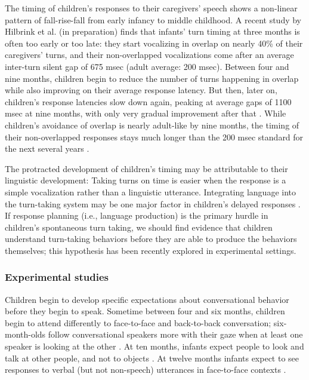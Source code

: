 \documentclass[authoryear, 12pt]{elsarticle}
\begin{document}
The timing of children's responses to their caregivers' speech shows a non-linear pattern of fall-rise-fall from early infancy to middle childhood. A recent study by Hilbrink et al. (in preparation) finds that infants' turn timing at three months is often too early or too late: they start vocalizing in overlap on nearly 40\% of their caregivers' turns, and their non-overlapped vocalizations come after an average inter-turn silent gap of 675 msec (adult average: 200 msec). Between four and nine months, children begin to reduce the number of turns happening in overlap while also improving on their average response latency. But then, later on, children's response latencies slow down again, peaking at average gaps of 1100 msec at nine months, with only very gradual improvement after that \citep{hilbrinkInPrep}. While children's avoidance of overlap is nearly adult-like by nine months, the timing of their non-overlapped responses stays much longer than the 200 msec standard for the next several years \citep{garvey1984, ervin-tripp1979}.

The protracted development of children's timing may be attributable to their linguistic development: Taking turns on time is easier when the response is a simple vocalization rather than a linguistic utterance. Integrating language into the turn-taking system may be one major factor in children's delayed responses \citep{casillasUndRev}. If response planning (i.e., language production) is the primary hurdle in children's spontaneous turn taking, we should find evidence that children understand turn-taking behaviors before they are able to produce the behaviors themselves; this hypothesis has been recently explored in experimental settings.

\subsubsection{Experimental studies}

Children begin to develop specific expectations about conversational behavior before they begin to speak. Sometime between four and six months, children begin to attend differently to face-to-face and back-to-back conversation; six-month-olds follow conversational speakers more with their gaze when at least one speaker is looking at the other \citep{augusti2010}. At ten months, infants expect people to look and talk at other people, and not to objects \citep{beier2012}. At twelve months infants expect to see responses to verbal (but not non-speech) utterances in face-to-face contexts \citep{thorgrimssonUndRev}.
\end{document}
